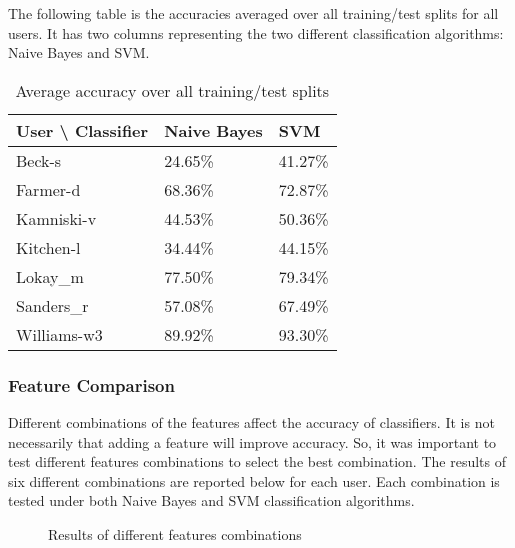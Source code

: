 The following table is the accuracies averaged over all training/test splits 
for all users. It has two columns representing the two different classification 
algorithms: Naive Bayes and SVM.

\begin{table} [!htbp]
	\begin{center}

	    \begin{tabular}{ | l | l | l |}
	    \hline
	    User {\textbackslash}  Classifier & Naive Bayes & SVM \\ \hline
	    Beck-s & 24.65\% & 41.27\% \\ \hline
	    Farmer-d & 68.36\% & 72.87\% \\ \hline
	    Kamniski-v & 44.53\% & 50.36\% \\ \hline
	    Kitchen-l & 34.44\% & 44.15\% \\ \hline
	    Lokay\_m & 77.50\% & 79.34\% \\ \hline
	    Sanders\_r & 57.08\% & 67.49\% \\ \hline
	    Williams-w3 & 89.92\% & 93.30\% \\
	    \hline
	    \end{tabular}
	\caption{Average accuracy over all training/test splits}
	\end{center}
\end{table}

\subsubsection{Feature Comparison}
Different combinations of the features affect the accuracy of classifiers. 
It is not necessarily that adding a feature will improve accuracy. So, it 
was important to test different features combinations to select the best 
combination. The results of six different combinations are reported below 
for each user. Each combination is tested under both Naive Bayes and SVM 
classification algorithms.

\begin{figure}[H]
    \begin{center}
    \end{center}
    \caption{Results of different features combinations}
\end{figure}

